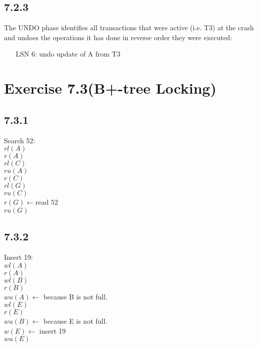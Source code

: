 \documentclass[12pt]{article}
\begin{document}
	\subsection*{7.2.3}
		The UNDO phase identifies all transactions that were active (i.e. T3) at the crash and undoes the operations it has done in reverse order they were executed:
		\begin{itemize}
			\setlength{\itemindent}{1cm}
			\item[LSN 6:] undo update of A from T3
		\end{itemize}	
		
	\section*{Exercise 7.3(B+-tree Locking)}
	\subsection*{7.3.1}
	Search 52:\\
	$rl(A)$\\
	$r(A)$\\
	$rl(C)$\\
	$ru(A)$\\
	$r(C)$\\
	$rl(G)$\\
	$ru(C)$\\
	$r(G)\leftarrow $read 52 \\
	$ru(G)$\\
	\subsection*{7.3.2}
	Insert 19:\\
	$wl(A)$\\
	$r(A)$\\
	$wl(B)$\\
	$r(B)$\\
	$wu(A)\leftarrow$ because B is not full.\\
	$wl(E)$\\
	$r(E)$\\
	$wu(B)\leftarrow $ because E is not full.\\
	$w(E)\leftarrow$ insert 19\\
	$wu(E)$\\
	
\end{document}
